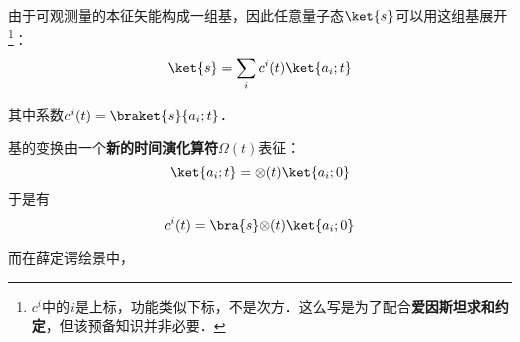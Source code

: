 由于可观测量的本征矢能构成一组基，因此任意量子态$\ket{s}$可以用这组基展开\footnote{$c^i$中的$i$是上标，功能类似下标，不是次方．这么写是为了配合\textbf{爱因斯坦求和约定}，但该预备知识并非必要．}：
\begin{equation}\label{HsbPic_eq12}
\ket{s} = \sum_i c^i(t)\ket{a_i; t}
\end{equation}

其中系数$c^i(t)=\braket{s}{a_i; t}$．


基的变换由一个\textbf{新的时间演化算符}$\mathcal{\Omega}(t)$表征：
\begin{equation}\label{HsbPic_eq13}
\ket{a_i; t} = \mathcal{\Omega}(t)\ket{a_i; 0}
\end{equation}
于是有
\begin{equation}
c^i(t) = \bra{s}\mathcal{\Omega}(t)\ket{a_i; 0}
\end{equation}

而在薛定谔绘景中，










